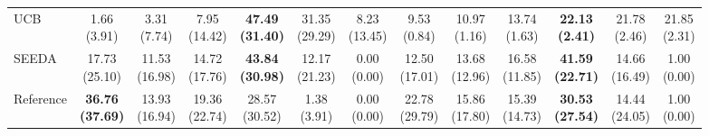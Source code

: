 {\begin{tabular}{l|cccccc|cccccc}
UCB & \makecell{1.66 \\ (3.91)} & \makecell{3.31 \\ (7.74)} & \makecell{7.95 \\ (14.42)} & {\cellcolor[HTML]{C8E6C9}} \bfseries \makecell{47.49 \\ (31.40)} & \makecell{31.35 \\ (29.29)} & \makecell{8.23 \\ (13.45)} & \makecell{9.53 \\ (0.84)} & \makecell{10.97 \\ (1.16)} & \makecell{13.74 \\ (1.63)} & {\cellcolor[HTML]{C8E6C9}} \bfseries \makecell{22.13 \\ (2.41)} & \makecell{21.78 \\ (2.46)} & \makecell{21.85 \\ (2.31)} \\
SEEDA & \makecell{17.73 \\ (25.10)} & \makecell{11.53 \\ (16.98)} & \makecell{14.72 \\ (17.76)} & {\cellcolor[HTML]{C8E6C9}} \bfseries \makecell{43.84 \\ (30.98)} & \makecell{12.17 \\ (21.23)} & \makecell{0.00 \\ (0.00)} & \makecell{12.50 \\ (17.01)} & \makecell{13.68 \\ (12.96)} & \makecell{16.58 \\ (11.85)} & {\cellcolor[HTML]{C8E6C9}} \bfseries \makecell{41.59 \\ (22.71)} & \makecell{14.66 \\ (16.49)} & \makecell{1.00 \\ (0.00)} \\
Reference & \bfseries \makecell{36.76 \\ (37.69)} & \makecell{13.93 \\ (16.94)} & \makecell{19.36 \\ (22.74)} & {\cellcolor[HTML]{C8E6C9}} \makecell{28.57 \\ (30.52)} & \makecell{1.38 \\ (3.91)} & \makecell{0.00 \\ (0.00)} & \makecell{22.78 \\ (29.79)} & \makecell{15.86 \\ (17.80)} & \makecell{15.39 \\ (14.73)} & {\cellcolor[HTML]{C8E6C9}} \bfseries \makecell{30.53 \\ (27.54)} & \makecell{14.44 \\ (24.05)} & \makecell{1.00 \\ (0.00)} \\

\end{tabular}}

